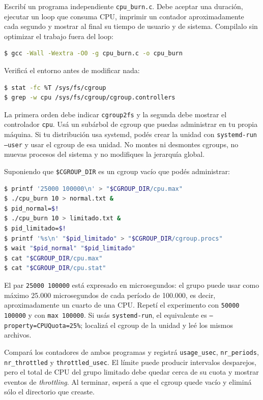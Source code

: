 \documentclass[11pt,a4paper]{article}
\begin{document}
Escribí un programa independiente \texttt{cpu\_burn.c}. Debe aceptar una
duración, ejecutar un loop que consuma CPU, imprimir un contador
aproximadamente cada segundo y mostrar al final su tiempo de usuario y de
sistema. Compilalo sin optimizar el trabajo fuera del loop:

\begin{lstlisting}[language=bash]
$ gcc -Wall -Wextra -O0 -g cpu_burn.c -o cpu_burn
\end{lstlisting}

Verificá el entorno antes de modificar nada:

\begin{lstlisting}[language=bash]
$ stat -fc %T /sys/fs/cgroup
$ grep -w cpu /sys/fs/cgroup/cgroup.controllers
\end{lstlisting}

La primera orden debe indicar \texttt{cgroup2fs} y la segunda debe mostrar el
controlador \texttt{cpu}. Usá un subárbol de cgroup que puedas administrar en tu
propia máquina. Si tu distribución usa systemd, podés crear la unidad con
\texttt{systemd-run --user} y usar el cgroup de esa unidad. No montes ni
desmontes cgroups, no muevas procesos del sistema y no modifiques la jerarquía
global.

Suponiendo que \texttt{\$CGROUP\_DIR} es un cgroup vacío que podés administrar:

\begin{lstlisting}[language=bash]
$ printf '25000 100000\n' > "$CGROUP_DIR/cpu.max"
$ ./cpu_burn 10 > normal.txt &
$ pid_normal=$!
$ ./cpu_burn 10 > limitado.txt &
$ pid_limitado=$!
$ printf '%s\n' "$pid_limitado" > "$CGROUP_DIR/cgroup.procs"
$ wait "$pid_normal" "$pid_limitado"
$ cat "$CGROUP_DIR/cpu.max"
$ cat "$CGROUP_DIR/cpu.stat"
\end{lstlisting}

El par \texttt{25000 100000} está expresado en microsegundos: el grupo puede
usar como máximo 25.000 microsegundos de cada período de 100.000, es decir,
aproximadamente un cuarto de una CPU. Repetí el experimento con
\texttt{50000 100000} y con \texttt{max 100000}. Si usás
\texttt{systemd-run}, el equivalente es \texttt{--property=CPUQuota=25\%};
localizá el cgroup de la unidad y leé los mismos archivos.

Compará los contadores de ambos programas y registrá \texttt{usage\_usec},
\texttt{nr\_periods}, \texttt{nr\_throttled} y \texttt{throttled\_usec}. El
límite puede producir intervalos desparejos, pero el total de CPU del grupo
limitado debe quedar cerca de su cuota y mostrar eventos de \emph{throttling}.
Al terminar, esperá a que el cgroup quede vacío y eliminá sólo el directorio
que creaste.
\end{document}
